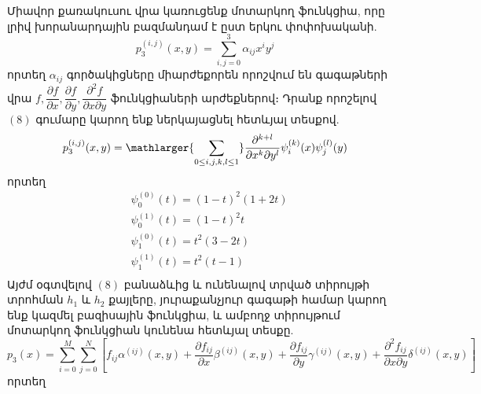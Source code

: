 \documentclass[fleqn, bachelor,subf,12pt,notitlepage]{article}
\begin{document}
Միավոր քառակուսու վրա կառուցենք մոտարկող ֆունկցիա, որը լրիվ խորանարդային բազմանդամ է ըստ երկու փոփոխականի.
\begin{equation}
			p_{3}^{(i, j)}(x, y)=\sum_{i, j=0}^{3}\alpha_{ij}x^{i}y^{j}
\end{equation}
որտեղ $\alpha_{ij}$ գործակիցները միարժեքորեն որոշվում են գագաթների վրա $f, \dfrac{\partial f}{\partial x}, \dfrac{\partial f}{\partial y}, \dfrac{\partial^{2} f}{\partial x \partial y}$ ֆունկցիաների արժեքներով։ Դրանք որոշելով $\left(8\right)$ գումարը կարող ենք ներկայացնել հետևյալ տեսքով.
\begin{equation}
			p_{3}^{(i, j)}(x, y)= \mathlarger{\sum_{0 \leq i, j, k, l \leq 1}} \dfrac{\partial^{k+l}}{\partial x^{k} \partial y^{l}}  \psi_{i}^{(k)}(x)\psi_{j}^{(l)}(y)
\end{equation}
որտեղ
\begin{equation*}
\begin{aligned}
&\psi_{0}^{(0)}(t) = \left(1-t\right)^{2}\left(1+2t\right) \\
&\psi_{0}^{(1)}(t) = \left(1-t\right)^{2}t \\
&\psi_{1}^{(0)}(t) = t^{2}\left(3-2t\right) \\
&\psi_{1}^{(1)}(t) = t^{2}\left(t-1\right) \\
\end{aligned}
\end{equation*}
Այժմ օգտվելով $\left(8\right)$ բանաձևից և ունենալով տրված տիրույթի տրոհման $h_{1}$ և $h_{2}$ քայլերը, յուրաքանչյուր գագաթի համար կարող ենք կազմել բազիսային ֆունկցիա, և ամբողջ տիրույթում մոտարկող ֆունկցիան կունենա հետևյալ տեսքը.
\begin{equation}
p_{3}(x)=\sum_{i=0}^{M}\sum_{j=0}^{N}\left[f_{ij}\alpha^{(ij)}\left(x,y\right)+\dfrac{\partial f_{ij}}{\partial x}\beta^{(ij)}\left(x,y\right) +\dfrac{\partial f_{ij}}{\partial y}\gamma^{(ij)}\left(x,y\right) +\dfrac{\partial^{2} f_{ij}}{\partial x\partial y}\delta^{(ij)}\left(x,y\right)\right]
\end{equation}
որտեղ
\end{document}
